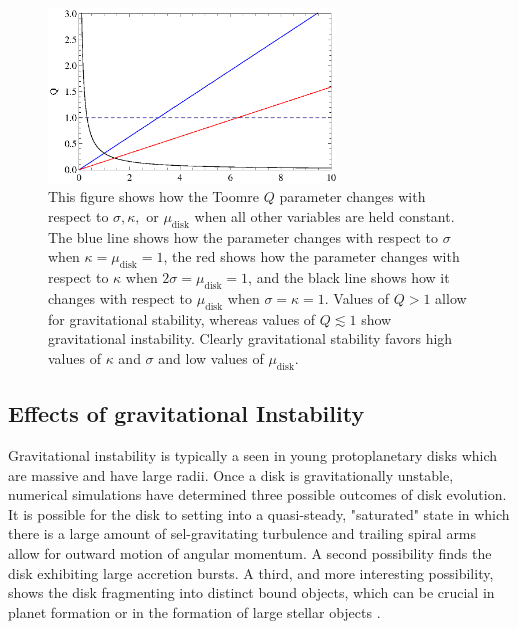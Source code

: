 \documentclass[aps,pra,twocolumn]{revtex4-1}
\begin{document}
\begin{figure} [b!]
	\includegraphics[width=3in]{qplot.eps}
	\caption{This figure shows how the Toomre $Q$ parameter changes with respect to $\sigma, \kappa,$ or $\mu_\text{disk}$ when all other variables are held constant.  The blue line shows how the parameter changes with respect to $\sigma$ when $\kappa = \mu_\text{disk} = 1$, the red shows how the parameter changes with respect to $\kappa$ when $2\sigma = \mu_\text{disk} = 1$, and the black line shows how it changes with respect to $\mu_\text{disk}$ when $\sigma = \kappa = 1$.  Values of $Q > 1$ allow for gravitational stability, whereas values of $Q \lesssim 1$ show gravitational instability.  Clearly gravitational stability favors high values of $\kappa$ and $\sigma$ and low values of $\mu_\text{disk}$. \label{qFig}}
\end{figure}



\subsection{\label{section 3.2} Effects of gravitational Instability}
Gravitational instability is typically a seen in young protoplanetary disks which are massive and have large radii.  Once a disk is gravitationally unstable, numerical simulations have determined three possible outcomes of disk evolution.  It is possible for the disk to setting into a quasi-steady, "saturated" state in which there is a large amount of sel-gravitating turbulence and trailing spiral arms allow for outward motion of angular momentum.  A second possibility finds the disk exhibiting large accretion bursts.  A third, and more interesting possibility, shows the disk fragmenting into distinct bound objects, which can be crucial in planet formation or in the formation of large stellar objects \cite{armitage2011}.
\end{document}
